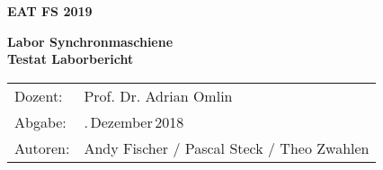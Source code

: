 \pagestyle{scrheadings} %
\begin{titlepage}

\begin{center}
\textbf{EAT FS 2019}\\
\vspace{15mm}

\textbf{\Huge Labor Synchronmaschiene}\\[2ex]
\textbf{Testat Laborbericht}\\
\vspace{40mm}


\begin{tabular}{ll}
Dozent:  & \quad Prof. Dr. Adrian Omlin\\[1ex]
Abgabe: & \quad 21.\,Dezember\,2018\\
Autoren:& \quad Andy Fischer / Pascal Steck / Theo Zwahlen\\

\end{tabular}

\end{center}

\end{titlepage}

